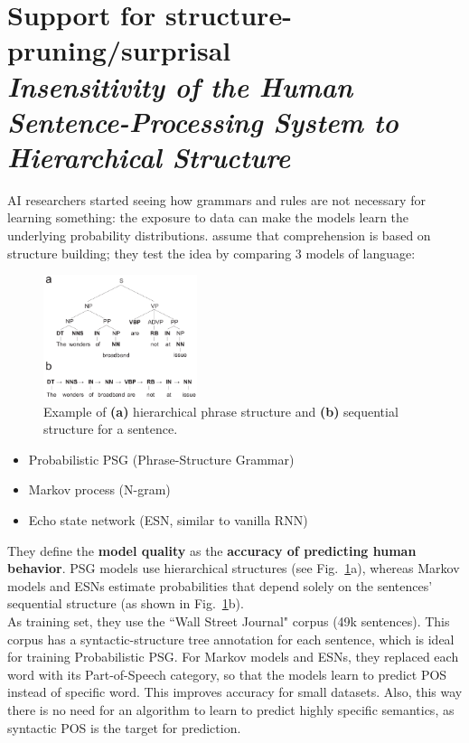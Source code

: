 \section[Support for structure-pruning/surprisal]{Support for structure-pruning/surprisal\\ \textit{Insensitivity of the Human Sentence-Processing System to Hierarchical Structure}\\
}
AI researchers started seeing how grammars and rules are not necessary for learning something: the exposure to data can make the models learn the underlying probability distributions. \cite{frank} assume that comprehension is based on structure building; they test the idea by comparing 3 models of language:

\begin{figure}
  \centering
  \includegraphics[width=0.4\textwidth]{images/frank.png}
  \caption{Example of \textbf{(a)} hierarchical phrase structure and \textbf{(b)} sequential structure for a sentence.}
  \label{fig:frank}
\end{figure}
\begin{itemize}
    \item Probabilistic PSG (Phrase-Structure Grammar)
    \item Markov process (N-gram)
    \item Echo state network (ESN, similar to vanilla RNN)
\end{itemize}
They define the \textbf{model quality} as the \textbf{accuracy of predicting human behavior}. PSG models use hierarchical structures (see Fig.~\ref{fig:frank}a), whereas Markov models and ESNs estimate probabilities that depend solely on the sentences' sequential structure (as shown in Fig.~\ref{fig:frank}b).\\

As training set, they use the ``Wall Street Journal" corpus (49k sentences). This corpus has a syntactic-structure tree annotation for each sentence, which is ideal for training Probabilistic PSG.
For Markov models and ESNs, they replaced each word with its Part-of-Speech category, so that the models learn to predict POS instead of specific word. This improves accuracy for small 
datasets. Also, this way there is no need for an algorithm to learn to predict highly specific semantics, as syntactic POS is the target for prediction.

